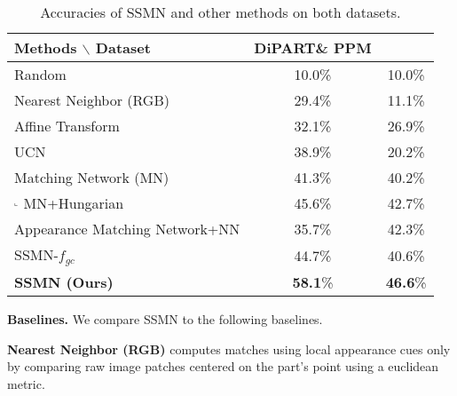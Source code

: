 \documentclass[10pt,twocolumn,letterpaper]{article}
\newcommand{\dataset}{\mbox{DiPART}}
\begin{document}
\begin{table}[t]
    \centering
    \begin{tabular}{lcc} 
        \toprule
        Methods $\backslash$ Dataset & \dataset\& PPM \\
        \hline
        Random                      & 10.0\% & 10.0\%\\
        Nearest Neighbor (RGB)      & 29.4\% & 11.1\%\\
        Affine Transform            & 32.1\% & 26.9\%\\
        UCN~\cite{Choy2016UniversalCN}         
                                    & 38.9\% & 20.2\%\\
        Matching Network (MN)~\cite{vinyalsBLKW16}    
                                    & 41.3\% & 40.2\%\\
        $^\llcorner$ MN+Hungarian        
                                    & 45.6\% & 42.7\%\\ %
        \hline
        Appearance Matching Network+NN   
                                    & 35.7\% & 42.3\%\\ %
        SSMN-$f_{gc}$
                                    & 44.7\% & 40.6\%\\
        \textbf{SSMN (Ours)}
                                    & \textbf{58.1}\% & \textbf{46.6}\%\\
        \bottomrule
    \end{tabular}
    \caption{Accuracies of SSMN and other methods on both datasets.}
    \vspace{-1em}
    \label{tab:results_10part}
\end{table}\vspace{.5em}\noindent\textbf{Baselines.}
We compare SSMN to the following baselines.

\noindent\textbf{Nearest Neighbor (RGB)} computes matches using local appearance cues only by comparing raw image patches centered on the part's point using a euclidean metric.
\end{document}

